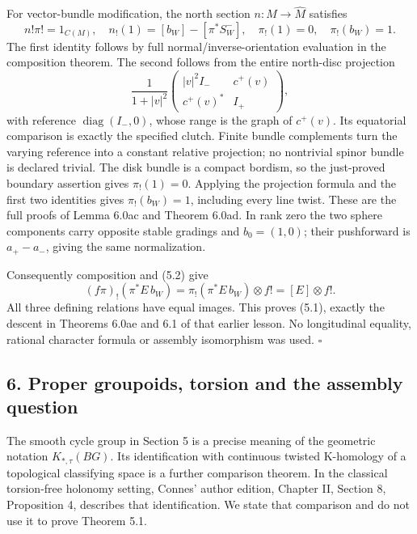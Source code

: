 \documentclass[
  11pt,
]{article}
\begin{document}
For vector-bundle modification, the north section \(n:M\to\widehat M\)
satisfies \[
 n!\pi!=1_{C(M)},\quad n_!(1)=[b_W]-[\pi^*S_W^-],\quad
 \pi_!(1)=0,\quad\pi_!(b_W)=1.
 \tag{5.2}
\] The first identity follows by full normal/inverse-orientation
evaluation in the composition theorem. The second follows from the
entire north-disc projection \[
 \frac1{1+|v|^2}
 \begin{pmatrix}|v|^2I_-&c^+(v)\\c^+(v)^*&I_+\end{pmatrix},
\] with reference \(\operatorname{diag}(I_-,0)\), whose range is the
graph of \(c^+(v)\). Its equatorial comparison is exactly the specified
clutch. Finite bundle complements turn the varying reference into a
constant relative projection; no nontrivial spinor bundle is declared
trivial. The disk bundle is a compact bordism, so the just-proved
boundary assertion gives \(\pi_!(1)=0\). Applying the projection formula
and the first two identities gives \(\pi_!(b_W)=1\), including every
line twist. These are the full proofs of Lemma 6.0ac and Theorem 6.0ad.
In rank zero the two sphere components carry opposite stable gradings
and \(b_0=(1,0)\); their pushforward is \(a_+-a_-\), giving the same
normalization.

Consequently composition and (5.2) give \[
 (f\pi)_!(\pi^*E\,b_W)=\pi_!(\pi^*E\,b_W)\otimes f!=[E]\otimes f!.
\] All three defining relations have equal images. This proves (5.1),
exactly the descent in Theorems 6.0ae and 6.1 of that earlier lesson. No
longitudinal equality, rational character formula or assembly
isomorphism was used. \(\square\)

\subsection{6. Proper groupoids, torsion and the assembly
question}\label{proper-groupoids-torsion-and-the-assembly-question}

The smooth cycle group in Section 5 is a precise meaning of the
geometric notation \(K_{*,\tau}(BG)\). Its identification with
continuous twisted K-homology of a topological classifying space is a
further comparison theorem. In the classical torsion-free holonomy
setting, Connes' author edition, Chapter II, Section 8, Proposition 4,
describes that identification. We state that comparison and do not use
it to prove Theorem 5.1.
\end{document}
